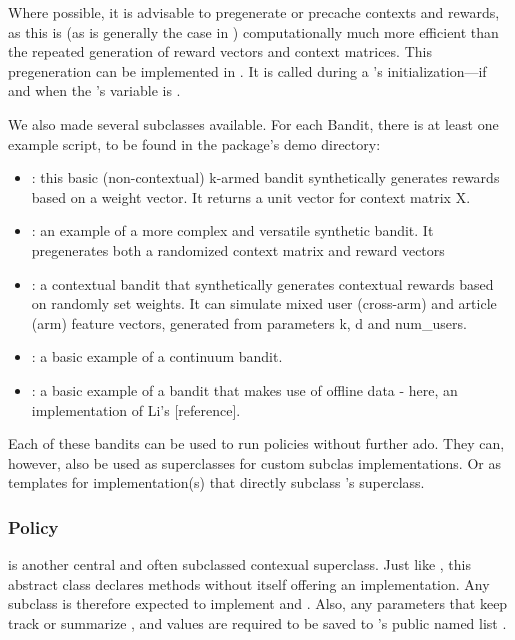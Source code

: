 \documentclass{jss}\usepackage[]{graphicx}\usepackage[]{color}
\begin{document}
Where possible, it is advisable to pregenerate or precache  contexts and rewards, as this is (as is generally the case in ) computationally much more efficient than the repeated generation of reward vectors and context matrices. This pregeneration can be implemented in . It is called during a 's initialization---if and when the 's  variable is .

We also made several  subclasses available. For each Bandit, there is at least one example script, to be found in the package’s demo directory:

\begin{itemize}
         \item {}: this basic (non-contextual) k-armed bandit synthetically generates rewards based on a weight vector. It returns a unit vector for context matrix X.
                  \item {}: an example of a more complex and versatile synthetic bandit. It pregenerates both a randomized context matrix and reward vectors
         \item {}: a contextual bandit that synthetically generates contextual rewards based on randomly set weights. It can simulate mixed user (cross-arm) and article (arm) feature vectors, generated from parameters k, d and num\_users.
         \item {}: a basic example of a continuum bandit.
         \item {}: a basic example of a bandit that makes use of offline data - here, an implementation of Li's [reference].
\end{itemize}

Each of these bandits can be used to run policies without further ado. They can, however, also be used as superclasses for custom  subclas implementations. Or as templates for  implementation(s) that directly subclass 's  superclass.

\subsubsection{Policy}

 is another central and often subclassed contexual superclass. Just like , this abstract class declares methods without itself offering an implementation. Any  subclass is therefore expected to implement  and . Also, any parameters that keep track or summarize ,  and  values are required to be saved to 's public named list .
\end{document}
